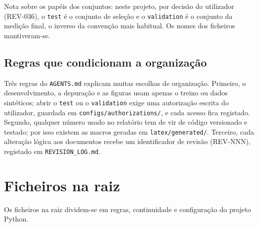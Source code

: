 \documentclass[11pt,a4paper]{article}
\newcommand{\f}[1]{\texttt{#1}}
\begin{document}
Nota sobre os papéis dos conjuntos: neste projeto, por decisão do utilizador (REV-036), o \f{test}
é o conjunto de seleção e o \f{validation} é o conjunto da medição final, o inverso da convenção
mais habitual. Os nomes dos ficheiros mantiveram-se.

\subsection{Regras que condicionam a organização}

Três regras do \f{AGENTS.md} explicam muitas escolhas de organização. Primeiro, o desenvolvimento,
a depuração e as figuras usam apenas o treino ou dados sintéticos; abrir o \f{test} ou o
\f{validation} exige uma autorização escrita do utilizador, guardada em
\f{configs/authorizations/}, e cada acesso fica registado. Segundo, qualquer número usado no
relatório tem de vir de código versionado e testado; por isso existem as macros geradas em
\f{latex/generated/}. Terceiro, cada alteração lógica aos documentos recebe um identificador de
revisão (REV-NNN), registado em \f{REVISION\_LOG.md}.

\section{Ficheiros na raiz}\label{sec:raiz}

Os ficheiros na raiz dividem-se em regras, continuidade e configuração do projeto Python.
\end{document}
